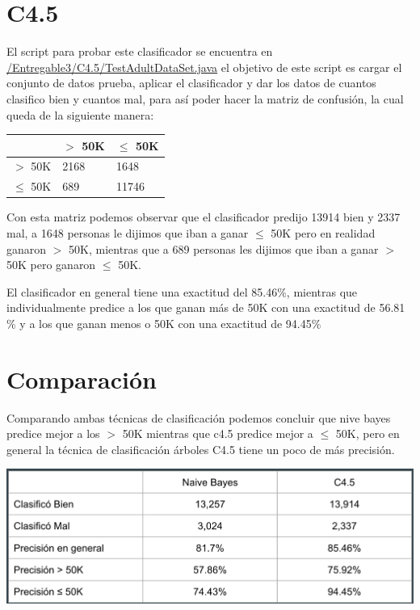 \documentclass{article}
\begin{document}
 \section{C4.5}

 El script para probar este clasificador se encuentra en \href{https://github.com/rodrigorojo/ProyectoFinalMineria/blob/master/Entregable3/NaiveBayes/TestAdultDataSet.java} {/Entregable3/C4.5/TestAdultDataSet.java} el objetivo de este script es cargar el conjunto de datos prueba, aplicar el clasificador y dar los datos de cuantos clasifico bien y cuantos mal, para así poder hacer la matriz de confusión, la cual queda de la siguiente manera:
 \begin{center}
   \begin{tabular}{|p{2cm}|p{2cm}|p{2cm}|}
     \hline
                  & $>$ 50K & $\leq$ 50K  \\ \hline
      $>$ 50K     & 2168    & 1648         \\ \hline
      $\leq$ 50K  & 689    & 11746        \\ \hline
    \end{tabular}
 \end{center}
 Con esta matriz podemos observar que el clasificador predijo 13914 bien y 2337 mal, a 1648 personas le dijimos que iban a ganar $\leq$ 50K pero en realidad ganaron $>$ 50K, mientras que a 689 personas les dijimos que iban a ganar $>$ 50K pero ganaron $\leq$ 50K.

 El clasificador en general tiene una exactitud del 85.46$\%$, mientras que individualmente predice a los que ganan más de 50K con una exactitud de 56.81$\%$ y a los que ganan menos o 50K con una exactitud de 94.45$\%$
 \section{Comparación}
 Comparando ambas técnicas de clasificación podemos concluir que nive bayes predice mejor a los $>$ 50K mientras que c4.5 predice mejor a $\leq$ 50K, pero en general la técnica de clasificación árboles C4.5 tiene un poco de más precisión.
\begin{center}
  \includegraphics[scale=0.5]{tabla}
\end{center}
\end{document}
